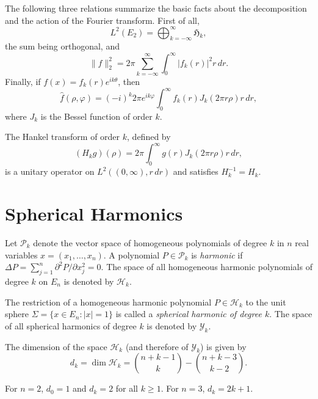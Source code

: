 The following three relations summarize the basic facts about the decomposition and the action of the Fourier transform. First of all,
\begin{equation}\label{eq:c4-1-3}
L^2(E_2) = \bigoplus_{k=-\infty}^\infty \mathfrak{H}_k,
\end{equation}
the sum being orthogonal, and
\begin{equation}\label{eq:c4-1-4}
\|f\|_2^2 = 2\pi \sum_{k=-\infty}^\infty \int_0^\infty |f_k(r)|^2 r\,dr.
\end{equation}
Finally, if $f(x) = f_k(r) e^{ik\theta}$, then
\begin{equation}\label{eq:c4-1-5}
\hat{f}(\rho, \varphi) = (-i)^k 2\pi e^{ik\varphi} \int_0^\infty f_k(r) J_k(2\pi r \rho) r\,dr,
\end{equation}
where $J_k$ is the Bessel function of order $k$.

\begin{theorem}\label{thm:c4-1-6}
The Hankel transform of order $k$, defined by
\[
(H_k g)(\rho) = 2\pi \int_0^\infty g(r) J_k(2\pi r \rho) r\,dr,
\]
is a unitary operator on $L^2((0, \infty), r\,dr)$ and satisfies $H_k^{-1} = H_k$.
\end{theorem}

\section{Spherical Harmonics}

Let $\mathcal{P}_k$ denote the vector space of homogeneous polynomials of degree $k$ in $n$ real variables $x = (x_1, \dots, x_n)$. A polynomial $P \in \mathcal{P}_k$ is \emph{harmonic} if $\Delta P = \sum_{j=1}^n \partial^2 P / \partial x_j^2 = 0$. The space of all homogeneous harmonic polynomials of degree $k$ on $E_n$ is denoted by $\mathcal{H}_k$.

The restriction of a homogeneous harmonic polynomial $P \in \mathcal{H}_k$ to the unit sphere $\Sigma = \{x \in E_n : |x| = 1\}$ is called a \emph{spherical harmonic of degree $k$}. The space of all spherical harmonics of degree $k$ is denoted by $\mathcal{Y}_k$.

\begin{theorem}\label{thm:c4-2-1}
The dimension of the space $\mathcal{H}_k$ (and therefore of $\mathcal{Y}_k$) is given by
\[
d_k = \dim \mathcal{H}_k = \binom{n + k - 1}{k} - \binom{n + k - 3}{k - 2}.
\]
\end{theorem}

\begin{corollary}\label{cor:c4-2-2}
For $n = 2$, $d_0 = 1$ and $d_k = 2$ for all $k \geq 1$. For $n = 3$, $d_k = 2k + 1$.
\end{corollary}

